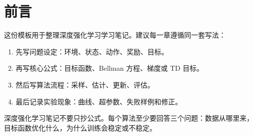 \chapter*{前言}

这份模板用于整理深度强化学习学习笔记。建议每一章遵循同一套写法：

\begin{enumerate}
  \item 先写问题设定：环境、状态、动作、奖励、目标。
  \item 再写核心公式：目标函数、Bellman 方程、梯度或 TD 目标。
  \item 然后写算法流程：采样、估计、更新、评估。
  \item 最后记录实验现象：曲线、超参数、失败样例和修正。
\end{enumerate}

\begin{keybox}
深度强化学习笔记不要只抄公式。每个算法至少要回答三个问题：数据从哪里来，目标函数优化什么，为什么训练会稳定或不稳定。
\end{keybox}
